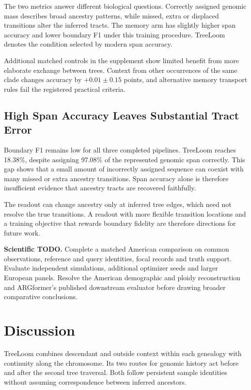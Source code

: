 \documentclass[letterpaper]{article}
\newcommand{\todo}[1]{\par\noindent\textbf{Scientific TODO.} #1\par}
\begin{document}
The two metrics answer different biological questions. Correctly assigned genomic mass describes broad ancestry patterns, while missed, extra or displaced transitions alter the inferred tracts. The memory arm has slightly higher span accuracy and lower boundary F1 under this training procedure. TreeLoom denotes the condition selected by modern span accuracy.

Additional matched controls in the supplement show limited benefit from more elaborate exchange between trees. Context from other occurrences of the same clade changes accuracy by $+0.01\pm0.15$ points, and alternative memory transport rules fail the registered practical criteria.

\subsection{High Span Accuracy Leaves Substantial Tract Error}
Boundary F1 remains low for all three completed pipelines. TreeLoom reaches 18.38\%, despite assigning 97.08\% of the represented genomic span correctly. This gap shows that a small amount of incorrectly assigned sequence can coexist with many missed or extra ancestry transitions. Span accuracy alone is therefore insufficient evidence that ancestry tracts are recovered faithfully.

The readout can change ancestry only at inferred tree edges, which need not resolve the true transitions. A readout with more flexible transition locations and a training objective that rewards boundary fidelity are therefore directions for future work.

\todo{Complete a matched American comparison on common observations, reference and query identities, focal records and truth support. Evaluate independent simulations, additional optimizer seeds and larger European panels. Resolve the American demographic and ploidy reconstruction and ARGformer's published downstream evaluator before drawing broader comparative conclusions.}

\section{Discussion}
TreeLoom combines descendant and outside context within each genealogy with continuity along the chromosome. Its two routes for genomic history act before and after the second tree traversal. Both follow persistent sample identities without assuming correspondence between inferred ancestors.
\end{document}
